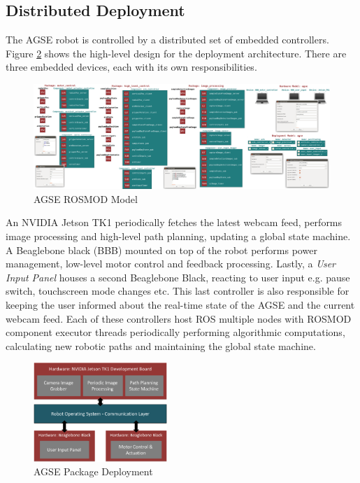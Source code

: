 \subsection{Distributed Deployment}

The AGSE robot is controlled by a distributed set of embedded controllers. Figure \ref{fig:AGSE_Deployment} shows the high-level design for the deployment architecture. There are three embedded devices, each with its own responsibilities. 

\begin{figure}[t]
	\centering	
	\includegraphics[width=1.0\linewidth]{figs/AGSE.png}
	\caption{AGSE ROSMOD Model}
	\label{fig:AGSE}	
\end{figure}


An NVIDIA Jetson TK1 periodically fetches the latest webcam feed, performs image processing and high-level path planning, updating a global state machine. A Beaglebone black (BBB) mounted on top of the robot performs power management, low-level motor control and feedback processing. Lastly, a \emph{User Input Panel} houses a second Beaglebone Black, reacting to user input e.g. pause switch, touchscreen mode changes etc. This last controller is also responsible for keeping the user informed about the real-time state of the AGSE and the current webcam feed. Each of these controllers host ROS multiple nodes with ROSMOD component executor threads periodically performing algorithmic computations, calculating new robotic paths and maintaining the global state machine.

\begin{figure}[h]
	\centering
	\includegraphics[width=0.45\textwidth]{figs/AGSE_Deployment.png}
	\caption{AGSE Package Deployment}
	\label{fig:AGSE_Deployment}
\end{figure}


